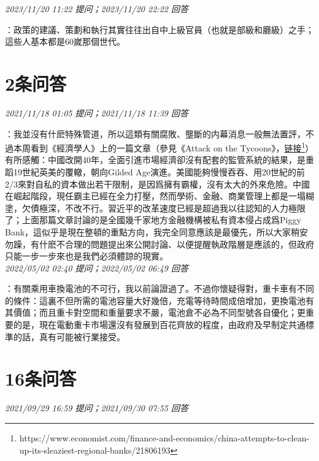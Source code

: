 \documentclass[twocolumn]{ctexart}
\begin{document}
\textit{\hfill\noindent\small 2023/11/20 11:22 提问；2023/11/20 22:22 回答}

：政策的建議、策劃和執行其實往往出自中上級官員（也就是部級和廳級）之手；這些人基本都是60嵗那個世代。
\\

\section{2条问答}

\textit{\hfill\noindent\small 2021/11/18 01:05 提问；2021/11/18 11:39 回答}

：我並沒有什麽特殊管道，所以這類有關腐敗、壟斷的内幕消息一般無法置評，不過本周看到《經濟學人》上的一篇文章（參見《Attack on the Tycoons》，\href{https://www.economist.com/finance-and-economics/china-attempts-to-clean-up-its-sleaziest-regional-banks/21806193}{链接\footnote{\url{https://www.economist.com/finance-and-economics/china-attempts-to-clean-up-its-sleaziest-regional-banks/21806193}}}）有所感觸：中國改開40年，全面引進市場經濟卻沒有配套的監管系統的結果，是重蹈19世紀英美的覆轍，朝向Gilded Age演進。美國能夠慢慢吞吞、用20世紀的前2/3來對自私的資本做出若干限制，是因爲擁有霸權，沒有太大的外來危險。中國在崛起階段，現任霸主已經在全力打壓，然而學術、金融、商業管理上都是一塌糊塗，欠債極深，不改不行。習近平的改革速度已經是超過我以往認知的人力極限了；上面那篇文章討論的是全國幾千家地方金融機構被私有資本侵占成爲Piggy Bank，這似乎是現在整頓的重點方向，我完全同意應該是最優先，所以大家稍安勿躁，有什麽不合理的問題提出來公開討論、以便提醒執政階層是應該的，但政府只能一步一步來也是我們必須體諒的現實。
\\

\textit{\hfill\noindent\small 2022/05/02 02:40 提问；2022/05/02 06:49 回答}

：有關乘用車換電池的不可行，我以前論證過了。不過你懷疑得對，重卡車有不同的條件：這裏不但所需的電池容量大好幾倍，充電等待時間成倍增加，更換電池有其價值；而且重卡對空間和重量要求不嚴，電池倉不必為不同型號各自優化；更重要的是，現在電動重卡市場還沒有發展到百花齊放的程度，由政府及早制定共通標準的話，真有可能被行業接受。
\\

\section{16条问答}

\textit{\hfill\noindent\small 2021/09/29 16:59 提问；2021/09/30 07:55 回答}
\end{document}
